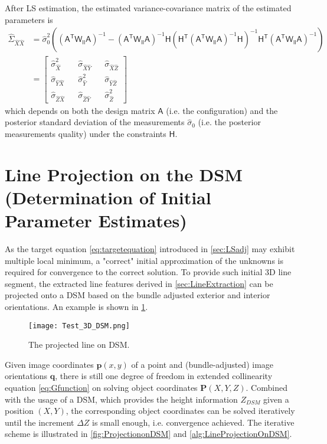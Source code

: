 After LS estimation, the estimated variance-covariance matrix of the estimated parameters is
\begin{equation} \label{eq:postSigmaXX}
\begin{split}
\hat{\Sigma}_{\hat{X}\hat{X}}&=
\hat{\sigma}_0^2
(
(\mathsf{A^TW_{ll}A})^{-1}
-
(\mathsf{A^TW_{ll}A})^{-1}
\mathsf{H}
(
\mathsf{H^T}
(\mathsf{A^TW_{ll}A})^{-1}
\mathsf{H}
)^{-1}
\mathsf{H^T}
(\mathsf{A^TW_{ll}A})^{-1}
)\\
&=
\begin{bmatrix}
\hat{\sigma}_{\hat{X}}^2 && \hat{\sigma}_{\hat{X}\hat{Y}} && \hat{\sigma}_{\hat{X}\hat{Z}} \\
\hat{\sigma}_{\hat{Y}\hat{X}} && \hat{\sigma}_{\hat{Y}}^2 && \hat{\sigma}_{\hat{Y}\hat{Z}} \\
\hat{\sigma}_{\hat{Z}\hat{X}} && \hat{\sigma}_{\hat{Z}\hat{Y}} && \hat{\sigma}_{\hat{Z}}^2
\end{bmatrix}
\end{split}
\end{equation}
which depends on both the design matrix $\mathsf{A}$ (i.e. the configuration) and the posterior standard deviation of the measurements $\hat{\sigma}_0$ (i.e. the posterior measurements quality) under the constraints $\mathsf{H}$.




\section{Line Projection on the DSM (Determination of Initial Parameter Estimates)}
\label{sec:LineProjectionOnDSM}

As the target equation \ref{eq:targetequation} introduced in \cref{sec:LSadj} may exhibit multiple local minimum, a "correct" initial approximation of the unknowns is required for convergence to the correct solution. To provide such initial 3D line segment, the extracted line features derived in \cref{sec:LineExtraction} can be projected onto a DSM based on the bundle adjusted exterior and interior orientations. An example is shown in \cref{fig:DSMprofile}.

\begin{figure}%
	\centering
	\texttt{[image: Test\_3D\_DSM.png]}
	\caption{\small The projected line on DSM.}
	\label{fig:DSMprofile}
\end{figure}


Given image coordinates $\mathbf{p}(x,y)$ of a point and (bundle-adjusted) image orientations $\mathbf{q}$, there is still one degree of freedom in extended collinearity equation \eqref{eq:Gfunction} on solving object coordinates $\mathbf{P}(X,Y,Z)$. Combined with the usage of a DSM, which provides the height information $Z_{DSM}$ given a position $(X,Y)$, the corresponding object coordinates can be solved iteratively until the increment $\Delta Z$ is small enough, i.e. convergence achieved. The iterative scheme is illustrated in \cref{fig:ProjectiononDSM} and \cref{alg:LineProjectionOnDSM}.

